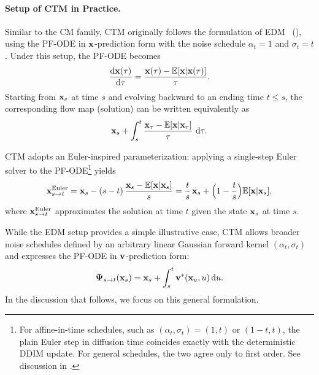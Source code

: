 \paragraph{Setup of CTM in Practice.}
Similar to the CM family, CTM originally follows the formulation of EDM~\citep{karras2022elucidating} (), 
using the PF-ODE in ${\mathbf{x}}$-prediction form with the noise schedule 
$\alpha_t = 1$ and $\sigma_t = t$. 
Under this setup, the PF-ODE becomes
\begin{align*}
    \frac{\mathop{}\!\mathrm{d} {\mathbf{x}}(\tau)}{\mathop{}\!\mathrm{d} \tau} 
    = \frac{{\mathbf{x}}(\tau) - \mathbb{E}[{\mathbf{x}}|{\mathbf{x}}(\tau)]}{\tau}.
\end{align*}
Starting from ${\mathbf{x}}_s$ at time $s$ and evolving backward to an ending
time $t\le s$,
the corresponding flow map (solution) can be written equivalently as
\begin{align*}
{\mathbf{x}}_s + \int_s^t 
    \frac{{\mathbf{x}}_\tau - \mathbb{E}[{\mathbf{x}} |{\mathbf{x}}_\tau]}{\tau}\, \mathop{}\!\mathrm{d} \tau.
\end{align*}

CTM adopts an Euler-inspired parameterization: applying a single-step Euler
solver to the PF-ODE\footnote{For affine-in-time schedules, such as
$(\alpha_t,\sigma_t)=(1,t)$ or $(1-t,t)$, the plain Euler step in diffusion
time coincides exactly with the deterministic DDIM update. For general
schedules, the two agree only to first order. See discussion in .} yields
\[
{\mathbf{x}}_{s\to t}^{\mathrm{Euler}}
= {\mathbf{x}}_s - (s-t)\,\frac{{\mathbf{x}}_s - \mathbb{E}[{\mathbf{x}}|{\mathbf{x}}_s]}{s}
= \frac{t}{s}\,{\mathbf{x}}_s + \Big(1 - \frac{t}{s}\Big)\mathbb{E}[{\mathbf{x}}|{\mathbf{x}}_s],
\]
where ${\mathbf{x}}_{s\to t}^{\mathrm{Euler}}$ approximates the solution at time $t$ given the state ${\mathbf{x}}_s$ at time $s$.

While the EDM setup provides a simple illustrative case, 
CTM allows broader noise schedules defined by an arbitrary linear Gaussian forward kernel $(\alpha_t, \sigma_t)$ 
and expresses the PF-ODE in ${\mathbf{v}}$-prediction form:
\[
{\bm{\Psi}}_{s\to t}({\mathbf{x}}_s)
= {\mathbf{x}}_s + \int_s^t {\mathbf{v}}^*({\mathbf{x}}_u,u) \mathop{}\!\mathrm{d} u.
\]
In the discussion that follows, we focus on this general formulation.


